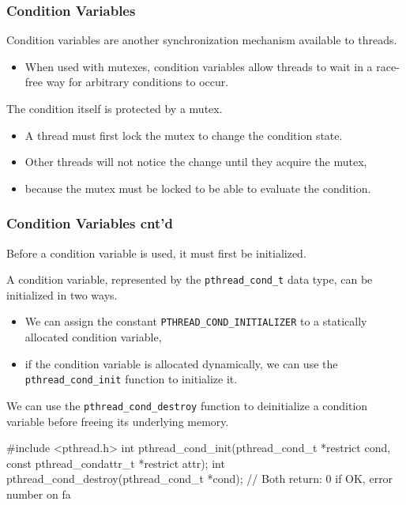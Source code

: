 \documentclass[newPxFont,sthlmFooter,nooffset]{beamer}
\begin{document}
\begin{frame}[t]
  \frametitle{Condition Variables}
Condition variables are another synchronization mechanism available to threads.
\begin{itemize}
\item When used with mutexes, condition variables allow threads to
  wait in a race-free way for arbitrary conditions to occur.
\end{itemize}

The condition itself is protected by a mutex.
\begin{itemize}
\item A thread must first lock the mutex to change the condition
  state.
\item Other threads will not notice the change until they acquire
  the mutex,
\item because the mutex must be locked to be able to evaluate
  the condition.
\end{itemize}

\end{frame}



\begin{frame}[t, fragile]
  \frametitle{Condition Variables cnt'd}
Before a condition variable is used, it must first be initialized.

A condition variable, represented by the \texttt{pthread\_cond\_t} data type, can be initialized in two ways.
\begin{itemize}
\item We can assign the constant \texttt{PTHREAD\_COND\_INITIALIZER} to a
  statically allocated condition variable,
\item if the condition variable is allocated dynamically, we can use
  the \texttt{pthread\_cond\_init} function to initialize it.
\end{itemize}

We can use the \texttt{pthread\_cond\_destroy} function to deinitialize a condition variable before freeing its underlying memory.

\begin{codedef}
#include <pthread.h>
int pthread_cond_init(pthread_cond_t *restrict cond,
                      const pthread_condattr_t *restrict attr);
int pthread_cond_destroy(pthread_cond_t *cond);
// Both return: 0 if OK, error number on fa
\end{codedef}

\end{frame}
\end{document}
